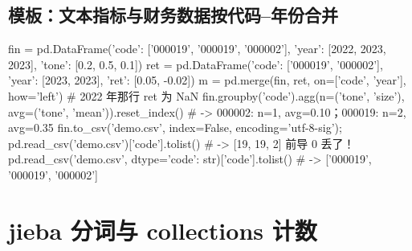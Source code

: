 \subsection{模板：文本指标与财务数据按代码–年份合并}
\begin{PYQcode}
fin = pd.DataFrame({'code': ['000019', '000019', '000002'], 'year': [2022, 2023, 2023], 'tone': [0.2, 0.5, 0.1]})
ret = pd.DataFrame({'code': ['000019', '000002'], 'year': [2023, 2023], 'ret': [0.05, -0.02]})
m = pd.merge(fin, ret, on=['code', 'year'], how='left')         # 2022 年那行 ret 为 NaN
fin.groupby('code').agg(n=('tone', 'size'), avg=('tone', 'mean')).reset_index()  # -> 000002: n=1, avg=0.10；000019: n=2, avg=0.35
fin.to_csv('demo.csv', index=False, encoding='utf-8-sig'); pd.read_csv('demo.csv')['code'].tolist()   # -> [19, 19, 2]  前导 0 丢了！
pd.read_csv('demo.csv', dtype={'code': str})['code'].tolist()   # -> ['000019', '000019', '000002']
\end{PYQcode}

\section{jieba 分词与 collections 计数}

